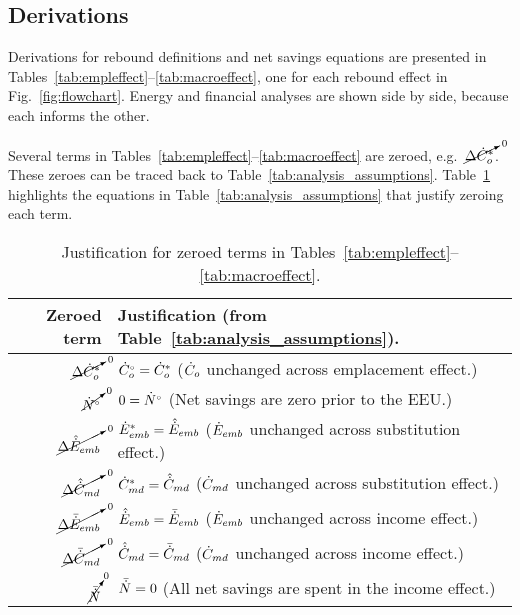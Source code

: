 \subsection{Derivations}
\label{sec:derivations}

Derivations for rebound definitions and net savings equations
are presented in Tables~\ref{tab:empleffect}--\ref{tab:macroeffect},
one for each rebound effect in Fig.~\ref{fig:flowchart}.
Energy and financial analyses are shown side by side, because
each informs the other.

Several terms in Tables~\ref{tab:empleffect}--\ref{tab:macroeffect}
are zeroed, e.g.\ $\cancelto{0}{\Delta {\dot{C}}^*_o}$. 
These zeroes can be traced back to Table~\ref{tab:analysis_assumptions}.
Table~\ref{tab:zeroed_terms} highlights the equations
in Table~\ref{tab:analysis_assumptions}
that justify zeroing each term.

\begin{table}
\centering %
\caption{Justification for zeroed terms in Tables~\ref{tab:empleffect}--\ref{tab:macroeffect}.}
\begin{tabular}{r l}
  \toprule
  Zeroed term & Justification (from Table~\ref{tab:analysis_assumptions}). \\
  \midrule
  $\cancelto{0}{\Delta {\dot{C}}^*_o}$    & ${}{\dot{C}}^{\scriptscriptstyle \circ}_o = {\dot{C}}^*_o$ ($\dot{C}_o$ unchanged across emplacement effect.) \\
  $\cancelto{0}{{}{\dot{N}}^{\scriptscriptstyle \circ}}$              & $0 = {}{\dot{N}}^{\scriptscriptstyle \circ}$ (Net savings are zero prior to the EEU.) \\
  $\cancelto{0}{\Delta \hat{\dot{E}}_{emb}}$ & ${\dot{E}}^*_{emb} = \hat{\dot{E}}_{emb}$ ($\dot{E}_{emb}$ unchanged across substitution effect.) \\
  $\cancelto{0}{\Delta \hat{\dot{C}}_{md}}$ & ${\dot{C}}^*_{md} = \hat{\dot{C}}_{md}$ ($\dot{C}_{md}$ unchanged across substitution effect.) \\
  $\cancelto{0}{\Delta \bar{\dot{E}}_{emb}}$ & $\hat{\dot{E}}_{emb} = \bar{\dot{E}}_{emb}$ ($\dot{E}_{emb}$ unchanged across income effect.) \\
  $\cancelto{0}{\Delta \bar{\dot{C}}_{md}}$ & $\hat{\dot{C}}_{md} = \bar{\dot{C}}_{md}$ ($\dot{C}_{md}$ unchanged across income effect.) \\
  $\cancelto{0}{\bar{\dot{N}}}$              & $\bar{\dot{N}} = 0$ (All net savings are spent in the income effect.) \\
  \bottomrule
\end{tabular}
\label{tab:zeroed_terms}
\end{table}



